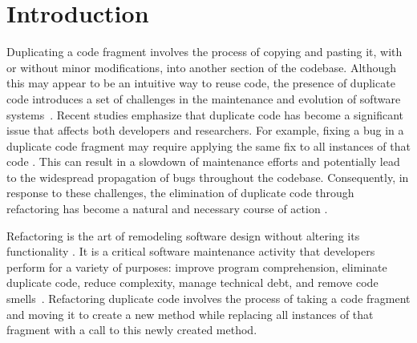 \section{Introduction}
\label{Section:Introduction}

Duplicating a code fragment involves the process of copying and pasting it, with or without minor modifications, into another section of the codebase. Although this may appear to be an intuitive way to reuse code, the presence of duplicate code introduces a set of challenges in the maintenance and evolution of software systems~\citep{roy2009comparison}. Recent studies emphasize that duplicate code has become a significant issue that affects both developers and researchers. For example, fixing a bug in a duplicate code fragment may require applying the same fix to all instances of that code \citep{thongtanunam2019will}. This can result in a slowdown of maintenance efforts and potentially lead to the widespread propagation of bugs throughout the codebase. Consequently, in response to these challenges, the elimination of duplicate code through refactoring has become a natural and necessary course of action \citep{fanta1999removing}.

Refactoring is the art of remodeling software design without altering its functionality \citep{Fowler:1999:RID:311424}. It is a critical software maintenance activity that developers perform for a variety of purposes: improve program comprehension, eliminate duplicate code, reduce complexity, manage technical debt, and remove code smells~\citep{silva2016we,murphy2008breaking}. Refactoring duplicate code involves the process of taking a code fragment and moving it to create a new method while replacing all instances of that fragment with a call to this newly created method.


